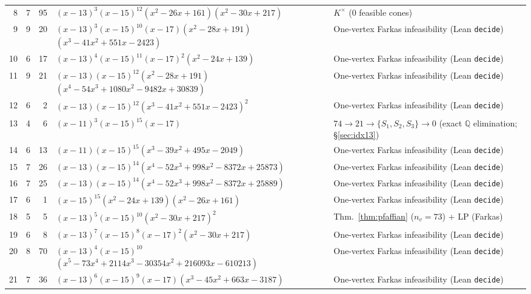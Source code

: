 \documentclass[11pt,reqno]{amsart}
\theoremstyle{definition}
\theoremstyle{remark}
\numberwithin{equation}{section}
\numberwithin{table}{section}
\begin{document}
{\begin{longtable}{@{}rrr>{\raggedright\arraybackslash}p{2.50in}>{\raggedright\arraybackslash}p{2.30in}@{}}
8 & 7 & 95 & $(x-13)^3$\allowbreak $(x-15)^{12}$\allowbreak $(x^2-26x+161)$\allowbreak $(x^2-30x+217)$ & $K^\times$ ($0$ feasible cones) \\
9 & 9 & 20 & $(x-13)^3$\allowbreak $(x-15)^{10}$\allowbreak $(x-17)$\allowbreak $(x^2-28x+191)$\allowbreak $(x^3-41x^2+551x-2423)$ & One-vertex Farkas infeasibility (Lean \texttt{decide}) \\
10 & 6 & 17 & $(x-13)^4$\allowbreak $(x-15)^{11}$\allowbreak $(x-17)^2$\allowbreak $(x^2-24x+139)$ & One-vertex Farkas infeasibility (Lean \texttt{decide}) \\
11 & 9 & 21 & $(x-13)$\allowbreak $(x-15)^{12}$\allowbreak $(x^2-28x+191)$\allowbreak $(x^4-54x^3+1080x^2-9482x+30839)$ & One-vertex Farkas infeasibility (Lean \texttt{decide}) \\
12 & 6 & 2 & $(x-13)$\allowbreak $(x-15)^{12}$\allowbreak $(x^3-41x^2+551x-2423)^2$ & One-vertex Farkas infeasibility (Lean \texttt{decide}) \\
13 & 4 & 6 & $(x-11)^3$\allowbreak $(x-15)^{15}$\allowbreak $(x-17)$ & $74\to 21\to \{S_1,S_2,S_3\}\to 0$ (exact $\mathbb{Q}$ elimination; \S\ref{sec:idx13}) \\
14 & 6 & 13 & $(x-11)$\allowbreak $(x-15)^{15}$\allowbreak $(x^3-39x^2+495x-2049)$ & One-vertex Farkas infeasibility (Lean \texttt{decide}) \\
15 & 7 & 26 & $(x-13)$\allowbreak $(x-15)^{14}$\allowbreak $(x^4-52x^3+998x^2-8372x+25873)$ & One-vertex Farkas infeasibility (Lean \texttt{decide}) \\
16 & 7 & 25 & $(x-13)$\allowbreak $(x-15)^{14}$\allowbreak $(x^4-52x^3+998x^2-8372x+25889)$ & One-vertex Farkas infeasibility (Lean \texttt{decide}) \\
17 & 6 & 1 & $(x-15)^{15}$\allowbreak $(x^2-24x+139)$\allowbreak $(x^2-26x+161)$ & One-vertex Farkas infeasibility (Lean \texttt{decide}) \\
18 & 5 & 5 & $(x-13)^5$\allowbreak $(x-15)^{10}$\allowbreak $(x^2-30x+217)^2$ & Thm.~\ref{thm:pfaffian} ($n_v=73$) + LP (Farkas) \\
19 & 6 & 8 & $(x-13)^7$\allowbreak $(x-15)^8$\allowbreak $(x-17)^2$\allowbreak $(x^2-30x+217)$ & One-vertex Farkas infeasibility (Lean \texttt{decide}) \\
20 & 8 & 70 & $(x-13)^4$\allowbreak $(x-15)^{10}$\allowbreak $(x^5-73x^4+2114x^3-30354x^2+216093x-610213)$ & One-vertex Farkas infeasibility (Lean \texttt{decide}) \\
21 & 7 & 36 & $(x-13)^6$\allowbreak $(x-15)^9$\allowbreak $(x-17)$\allowbreak $(x^3-45x^2+663x-3187)$ & One-vertex Farkas infeasibility (Lean \texttt{decide}) \\

\end{longtable}}
\end{document}
